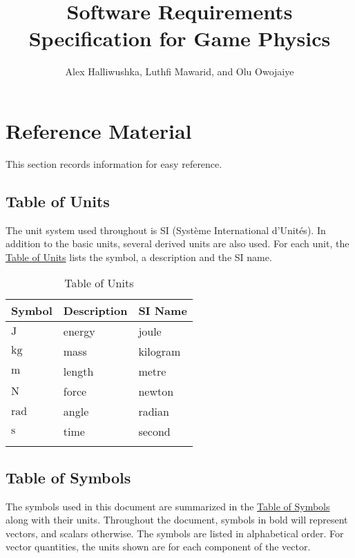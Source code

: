 \documentclass[12pt]{article}
\title{Software Requirements Specification for Game Physics}
\author{Alex Halliwushka, Luthfi Mawarid, and Olu Owojaiye}
\begin{document}
\maketitle
\tableofcontents
\newpage
\section{Reference Material}
\label{Sec:RefMat}
This section records information for easy reference.

\subsection{Table of Units}
\label{Sec:ToU}
The unit system used throughout is SI (Système International d'Unités). In addition to the basic units, several derived units are also used. For each unit, the \hyperref[Table:ToU]{Table of Units} lists the symbol, a description and the SI name.

\begin{longtable}{l l l}
\toprule
\textbf{Symbol} & \textbf{Description} & \textbf{SI Name}
\\
\midrule
\endhead
${\text{J}}$ & energy & joule
\\
${\text{kg}}$ & mass & kilogram
\\
${\text{m}}$ & length & metre
\\
${\text{N}}$ & force & newton
\\
${\text{rad}}$ & angle & radian
\\
${\text{s}}$ & time & second
\\
\bottomrule
\caption{Table of Units}
\label{Table:ToU}
\end{longtable}
\subsection{Table of Symbols}
\label{Sec:ToS}
The symbols used in this document are summarized in the \hyperref[Table:ToS]{Table of Symbols} along with their units. Throughout the document, symbols in bold will represent vectors, and scalars otherwise. The symbols are listed in alphabetical order. For vector quantities, the units shown are for each component of the vector.
\end{document}
